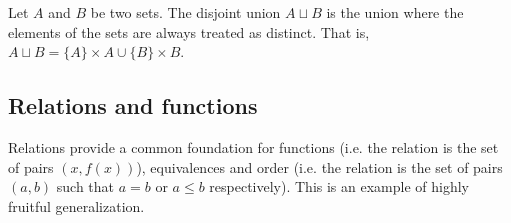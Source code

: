 \documentclass{article}
\begin{document}
\begin{defn}
	Let $A$ and $B$ be two sets. The disjoint union $A \sqcup B$ is the union where the elements of the sets are always treated as distinct. That is, $A \sqcup B = \{A\} \times A \cup \{B\} \times B$.
\end{defn}

\subsection{Relations and functions}

\begin{remark}
	Relations provide a common foundation for functions (i.e. the relation is the set of pairs $(x, f(x))$), equivalences and order (i.e. the relation is the set of pairs $(a, b)$ such that $a=b$ or $a\leq b$ respectively). This is an example of highly fruitful generalization.
\end{remark}
\end{document}
